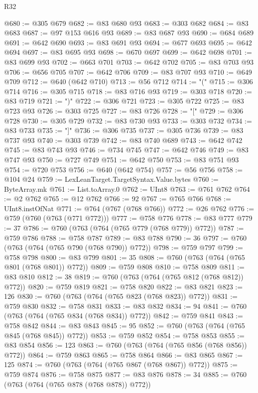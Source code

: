 \begin{lexlean}{R32}
\begin{coremodule}
@680 := @305 @679
@682 := @83 @680 @93
@683 := @303 @682
@684 := @83 @683
@687 := @97 @153 @616 @93
@689 := @83 @687 @93
@690 := @684 @689
@691 := @642 @690
@693 := @83 @691 @93
@694 := @677 @693
@695 := @642 @694
@697 := @83 @695 @93
@698 := @670 @697
@699 := @642 @698
@701 := @83 @699 @93
@702 := @663 @701
@703 := @642 @702
@705 := @83 @703 @93
@706 := @656 @705
@707 := @642 @706
@709 := @83 @707 @93
@710 := @649 @709
@712 := @640 (@642 @710)
@713 := @56 @712
@714 := "("
@715 := @306 @714
@716 := @305 @715
@718 := @83 @716 @93
@719 := @303 @718
@720 := @83 @719
@721 := ")"
@722 := @306 @721
@723 := @305 @722
@725 := @83 @723 @93
@726 := @303 @725
@727 := @83 @726
@728 := "["
@729 := @306 @728
@730 := @305 @729
@732 := @83 @730 @93
@733 := @303 @732
@734 := @83 @733
@735 := "]"
@736 := @306 @735
@737 := @305 @736
@739 := @83 @737 @93
@740 := @303 @739
@742 := @83 @740 @689
@743 := @642 @742
@745 := @83 @743 @93
@746 := @734 @745
@747 := @642 @746
@749 := @83 @747 @93
@750 := @727 @749
@751 := @642 @750
@753 := @83 @751 @93
@754 := @720 @753
@756 := @640 (@642 @754)
@757 := @56 @756
@758 := @104 @24
@759 := LexLeanTarget.TargetSyntax.Value.bytes
@760 := ByteArray.mk
@761 := List.toArray.{0}
@762 := UInt8
@763 := @761 @762
@764 := @2 @762
@765 := @12 @762
@766 := 92
@767 := @765 @766
@768 := UInt8.instOfNat
@771 := @764 (@767 (@768 @766))
@772 := @26 @762
@776 := @759 (@760 (@763 (@771 @772)))
@777 := @758 @776
@778 := @83 @777
@779 := 37
@786 := @760 (@763 (@764 (@765 @779 (@768 @779)) @772))
@787 := @759 @786
@788 := @758 @787
@789 := @83 @788
@790 := 36
@797 := @760 (@763 (@764 (@765 @790 (@768 @790)) @772))
@798 := @759 @797
@799 := @758 @798
@800 := @83 @799
@801 := 35
@808 := @760 (@763 (@764 (@765 @801 (@768 @801)) @772))
@809 := @759 @808
@810 := @758 @809
@811 := @83 @810
@812 := 38
@819 := @760 (@763 (@764 (@765 @812 (@768 @812)) @772))
@820 := @759 @819
@821 := @758 @820
@822 := @83 @821
@823 := 126
@830 := @760 (@763 (@764 (@765 @823 (@768 @823)) @772))
@831 := @759 @830
@832 := @758 @831
@833 := @83 @832
@834 := 94
@841 := @760 (@763 (@764 (@765 @834 (@768 @834)) @772))
@842 := @759 @841
@843 := @758 @842
@844 := @83 @843
@845 := 95
@852 := @760 (@763 (@764 (@765 @845 (@768 @845)) @772))
@853 := @759 @852
@854 := @758 @853
@855 := @83 @854
@856 := 123
@863 := @760 (@763 (@764 (@765 @856 (@768 @856)) @772))
@864 := @759 @863
@865 := @758 @864
@866 := @83 @865
@867 := 125
@874 := @760 (@763 (@764 (@765 @867 (@768 @867)) @772))
@875 := @759 @874
@876 := @758 @875
@877 := @83 @876
@878 := 34
@885 := @760 (@763 (@764 (@765 @878 (@768 @878)) @772))

\end{coremodule}
\end{lexlean}
